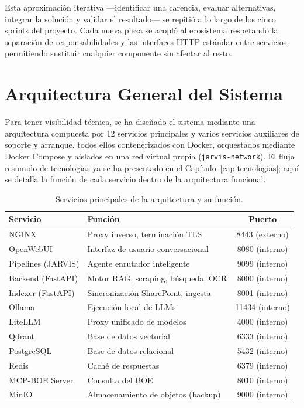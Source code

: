 Esta aproximación iterativa ---identificar una carencia, evaluar alternativas, integrar la solución y validar el resultado--- se repitió a lo largo de los cinco sprints del proyecto. Cada nueva pieza se acopló al ecosistema respetando la separación de responsabilidades y las interfaces HTTP estándar entre servicios, permitiendo sustituir cualquier componente sin afectar al resto.

\section{Arquitectura General del Sistema}
\label{sec:arquitectura-general}

Para tener visibilidad técnica, se ha diseñado el sistema mediante una arquitectura compuesta por 12 servicios principales y varios servicios auxiliares de soporte y arranque, todos ellos contenerizados con Docker, orquestados mediante Docker Compose y aislados en una red virtual propia (\texttt{jarvis-network}). El flujo resumido de tecnologías ya se ha presentado en el Capítulo~\ref{cap:tecnologias}; aquí se detalla la función de cada servicio dentro de la arquitectura funcional.

\begin{table}[H]
\centering
\caption{Servicios principales de la arquitectura y su función.}
\label{tab:servicios-completos}
\begin{tabular}{llc}
\toprule
\textbf{Servicio} & \textbf{Función} & \textbf{Puerto} \\
\midrule
NGINX              & Proxy inverso, terminación TLS        & 8443 (externo) \\
OpenWebUI          & Interfaz de usuario conversacional     & 8080 (interno) \\
Pipelines (JARVIS) & Agente enrutador inteligente           & 9099 (interno) \\
Backend (FastAPI)  & Motor RAG, scraping, búsqueda, OCR     & 8000 (interno) \\
Indexer (FastAPI)  & Sincronización SharePoint, ingesta     & 8001 (interno) \\
Ollama             & Ejecución local de LLMs                & 11434 (interno) \\
LiteLLM            & Proxy unificado de modelos             & 4000 (interno) \\
Qdrant             & Base de datos vectorial                & 6333 (interno) \\
PostgreSQL         & Base de datos relacional               & 5432 (interno) \\
Redis              & Caché de respuestas                    & 6379 (interno) \\
MCP-BOE Server     & Consulta del BOE                       & 8010 (interno) \\
MinIO              & Almacenamiento de objetos (backup)     & 9000 (interno) \\
\bottomrule
\end{tabular}
\end{table}


